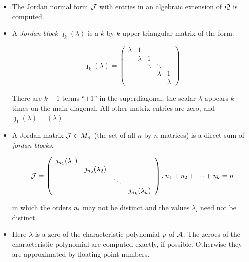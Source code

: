 \begin{itemize}
\item The Jordan normal form ${\cal J}$ with entries in an algebraic
      extension of ${\cal Q}$ is computed.

\item A {\it Jordan block} ${\jmath}_{k}(\lambda)$ is a $k$ by $k$
      upper triangular matrix of the form:

      \begin{displaymath}
      {\jmath}_{k}(\lambda) = \left( \begin{array}{ccccc} \lambda & 1
      &  &  & \\  &  \lambda & 1  & & \\ &
      & \ddots & \ddots & \\ &  &  &  \lambda & 1 \\ &
      &  &  & \lambda \end{array} \right)
      \end{displaymath}

      There are $k-1$ terms ``$+1$'' in the superdiagonal; the scalar
      $\lambda$ appears $k$ times on the main diagonal. All other
      matrix entries are zero, and ${\jmath}_{1}(\lambda) = (\lambda)$.

\item A Jordan matrix ${\cal J} \in M_{n}$ (the set of all $n$ by $n$
      matrices) is a direct sum of {\it jordan blocks}.

      \begin{displaymath}
      {\cal J} = \left( \begin{array}{cccc} \jmath_{n_1}(\lambda_{1})
      \\  & \jmath_{n_2}(\lambda_{2}) \\ & & \ddots \\ & & &
      \jmath_{n_k}(\lambda_{k}) \end{array} \right),
      {\it n}_{1}+{\it n}_{2}+\cdots +{\it n}_{k} = n
      \end{displaymath}

      in which the orders ${\it n}_{i}$ may not be distinct and the
      values ${\lambda_{i}}$ need not be distinct.

\item Here ${\lambda}$ is a zero of the characteristic polynomial
      ${\it p}$ of ${\cal A}$. The zeroes of the characteristic
      polynomial are computed exactly, if possible. Otherwise they are
      approximated by floating point numbers.
\end{itemize}

